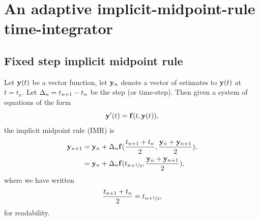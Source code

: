 


\newcommand{\thfx}[1]{t_{#1+\half}}
\newcommand{\thf}{\thfx{n}}

\newcommand{\yvhfx}[2]{\yv#1(\thfx{#2})}
\newcommand{\yvhf}[1][]{\yvhfx{#1}{n}}

\newcommand{\dfdy}{F}
\newcommand{\dfdyhfx}[1]{\dfdy_{#1+\half}}
\newcommand{\dfdyhf}{\dfdyhfx{n}}

\newcommand{\ymiderr}{a_n}

\newcommand{\imr}{IMR}



\section{An adaptive implicit-midpoint-rule time-integrator}





\subsection{Fixed step implicit midpoint rule}

Let $\mathbf{y}(t)$ be a vector function, let $\mathbf{y}_n$ denote a vector of estimates to $\mathbf{y}(t)$ at $t = t_n$.
Let $\Delta_{n} = t_{n+1} - t_n$ be the step (or time-step).
Then given a system of equations of the form
\begin{equation}
  \mathbf{y}'(t) = {\mathbf{f}}(t, \mathbf{y}(t)),
  \label{eq:43}
\end{equation}
the implicit midpoint rule (\imr) is
\begin{align}
  \yv_{n+1} &= \yv_n + \dtn \fv(\frac{t_{n+1} + t_n}{2}, \frac{\yv_n + \yv_{n+1}}{2}), \notag\\
  &= \yv_n + \dtn \fv(\thf, \frac{\yv_n + \yv_{n+1}}{2}),
  \label{eq:basic-midpoint}
\end{align}
where we have written
\begin{equation}
  \frac{t_{n+1} + t_n}{2} = \thf,
\end{equation}
for readability.

